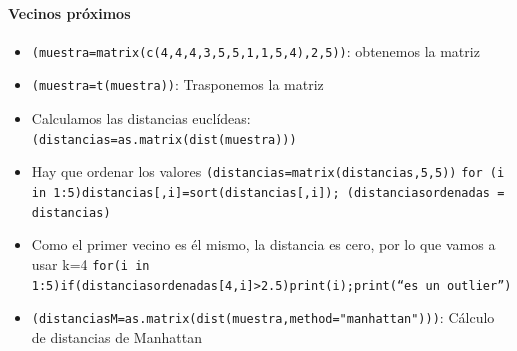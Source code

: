 \documentclass[a4paper, 12pt]{article}
\begin{document}
	\paragraph{Vecinos próximos}
	\begin{itemize}
		\item \texttt{(muestra=matrix(c(4,4,4,3,5,5,1,1,5,4),2,5))}: obtenemos la matriz
		\item \texttt{(muestra=t(muestra))}: Trasponemos la matriz
		\item Calculamos las distancias euclídeas: \texttt{(distancias=as.matrix(dist(muestra)))}
		\item Hay que ordenar los valores \texttt{(distancias=matrix(distancias,5,5))} \texttt{for (i in 1:5){distancias[,i]=sort(distancias[,i])}; (distanciasordenadas = distancias)}
		\item Como el primer vecino es él mismo, la distancia es cero, por lo que vamos a usar k=4 \texttt{for(i in 1:5){if(distanciasordenadas[4,i]>2.5){print(i);print(``es un outlier'')}}}
		\item \texttt{(distanciasM=as.matrix(dist(muestra,method="manhattan")))}: Cálculo de distancias de Manhattan
	\end{itemize}
\end{document}
